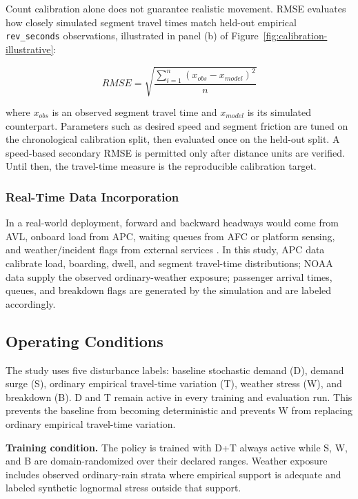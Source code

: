 Count calibration alone does not guarantee realistic movement. RMSE evaluates how closely simulated segment travel times match held-out empirical \texttt{rev\_seconds} observations, illustrated in panel (b) of Figure~\ref{fig:calibration-illustrative}:

\begin{equation} RMSE = \sqrt{\frac{\sum_{i=1}^{n}(x_{obs} - x_{model})^2}{n}} \label{eq:rmse} \end{equation}

where $x_{obs}$ is an observed segment travel time and $x_{model}$ is its simulated counterpart. Parameters such as desired speed and segment friction are tuned on the chronological calibration split, then evaluated once on the held-out split. A speed-based secondary RMSE is permitted only after distance units are verified. Until then, the travel-time measure is the reproducible calibration target.

\subsubsection{Real-Time Data Incorporation}

In a real-world deployment, forward and backward headways would come from AVL, onboard load from APC, waiting queues from AFC or platform sensing, and weather/incident flags from external services \cite{Wangsun}. In this study, APC data calibrate load, boarding, dwell, and segment travel-time distributions; NOAA data supply the observed ordinary-weather exposure; passenger arrival times, queues, and breakdown flags are generated by the simulation and are labeled accordingly.

\subsection{Operating Conditions}

The study uses five disturbance labels: baseline stochastic demand (D), demand surge (S), ordinary empirical travel-time variation (T), weather stress (W), and breakdown (B). D and T remain active in every training and evaluation run. This prevents the baseline from becoming deterministic and prevents W from replacing ordinary empirical travel-time variation.

\textbf{Training condition.} The policy is trained with D+T always active while S, W, and B are domain-randomized over their declared ranges. Weather exposure includes observed ordinary-rain strata where empirical support is adequate and labeled synthetic lognormal stress outside that support.

